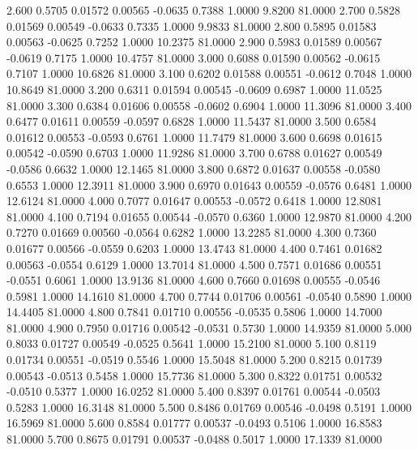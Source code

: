    2.600   0.5705   0.01572   0.00565  -0.0635   0.7388   1.0000   9.8200  81.0000
   2.700   0.5828   0.01569   0.00549  -0.0633   0.7335   1.0000   9.9833  81.0000
   2.800   0.5895   0.01583   0.00563  -0.0625   0.7252   1.0000  10.2375  81.0000
   2.900   0.5983   0.01589   0.00567  -0.0619   0.7175   1.0000  10.4757  81.0000
   3.000   0.6088   0.01590   0.00562  -0.0615   0.7107   1.0000  10.6826  81.0000
   3.100   0.6202   0.01588   0.00551  -0.0612   0.7048   1.0000  10.8649  81.0000
   3.200   0.6311   0.01594   0.00545  -0.0609   0.6987   1.0000  11.0525  81.0000
   3.300   0.6384   0.01606   0.00558  -0.0602   0.6904   1.0000  11.3096  81.0000
   3.400   0.6477   0.01611   0.00559  -0.0597   0.6828   1.0000  11.5437  81.0000
   3.500   0.6584   0.01612   0.00553  -0.0593   0.6761   1.0000  11.7479  81.0000
   3.600   0.6698   0.01615   0.00542  -0.0590   0.6703   1.0000  11.9286  81.0000
   3.700   0.6788   0.01627   0.00549  -0.0586   0.6632   1.0000  12.1465  81.0000
   3.800   0.6872   0.01637   0.00558  -0.0580   0.6553   1.0000  12.3911  81.0000
   3.900   0.6970   0.01643   0.00559  -0.0576   0.6481   1.0000  12.6124  81.0000
   4.000   0.7077   0.01647   0.00553  -0.0572   0.6418   1.0000  12.8081  81.0000
   4.100   0.7194   0.01655   0.00544  -0.0570   0.6360   1.0000  12.9870  81.0000
   4.200   0.7270   0.01669   0.00560  -0.0564   0.6282   1.0000  13.2285  81.0000
   4.300   0.7360   0.01677   0.00566  -0.0559   0.6203   1.0000  13.4743  81.0000
   4.400   0.7461   0.01682   0.00563  -0.0554   0.6129   1.0000  13.7014  81.0000
   4.500   0.7571   0.01686   0.00551  -0.0551   0.6061   1.0000  13.9136  81.0000
   4.600   0.7660   0.01698   0.00555  -0.0546   0.5981   1.0000  14.1610  81.0000
   4.700   0.7744   0.01706   0.00561  -0.0540   0.5890   1.0000  14.4405  81.0000
   4.800   0.7841   0.01710   0.00556  -0.0535   0.5806   1.0000  14.7000  81.0000
   4.900   0.7950   0.01716   0.00542  -0.0531   0.5730   1.0000  14.9359  81.0000
   5.000   0.8033   0.01727   0.00549  -0.0525   0.5641   1.0000  15.2100  81.0000
   5.100   0.8119   0.01734   0.00551  -0.0519   0.5546   1.0000  15.5048  81.0000
   5.200   0.8215   0.01739   0.00543  -0.0513   0.5458   1.0000  15.7736  81.0000
   5.300   0.8322   0.01751   0.00532  -0.0510   0.5377   1.0000  16.0252  81.0000
   5.400   0.8397   0.01761   0.00544  -0.0503   0.5283   1.0000  16.3148  81.0000
   5.500   0.8486   0.01769   0.00546  -0.0498   0.5191   1.0000  16.5969  81.0000
   5.600   0.8584   0.01777   0.00537  -0.0493   0.5106   1.0000  16.8583  81.0000
   5.700   0.8675   0.01791   0.00537  -0.0488   0.5017   1.0000  17.1339  81.0000
